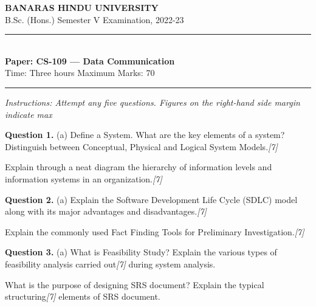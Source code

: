 \documentclass[11pt,a4paper]{article}
\newcommand{\pts}[1]{\hfill   \textit{[#1]}}
\begin{document}
\begin{center}
  {\large\bfseries BANARAS HINDU UNIVERSITY}\\[2pt]
  {\normalsize B.Sc. (Hons.) Semester V Examination, 2022-23}\\[6pt]
  \rule{0.8\linewidth}{0.5pt}\\[6pt]
  {\large\bfseries Paper: CS-109 --- Data Communication}\\[4pt]
  {\normalsize Time: Three hours \hfill Maximum Marks: 70}
\end{center}

\rule{\linewidth}{0.4pt}

\smallskip



\noindent   \textit{Instructions: Attempt any five questions. Figures on the right-hand side margin indicate max}

\bigskip

\medskip


\noindent   \textbf{Question 1.} (a) Define a System. What are the key elements of a system? Distinguish between Conceptual, Physical and Logical System Models.\pts{7}

\begin{parts}
  \item Explain through a neat diagram the hierarchy of information levels and information systems in an organization.\pts{7}
\end{parts}

\medskip


\noindent   \textbf{Question 2.} (a) Explain the Software Development Life Cycle (SDLC) model along with its major advantages and disadvantages.\pts{7}

\begin{parts}
  \item Explain the commonly used Fact Finding Tools for Preliminary Investigation.\pts{7}
\end{parts}

\medskip


\noindent   \textbf{Question 3.} (a) What is Feasibility Study? Explain the various types of feasibility analysis carried out\pts{7}
during system analysis.

\begin{parts}
  \item What is the purpose of designing SRS document? Explain the typical structuring\pts{7}
  elements of SRS document.
\end{parts}
\end{document}
